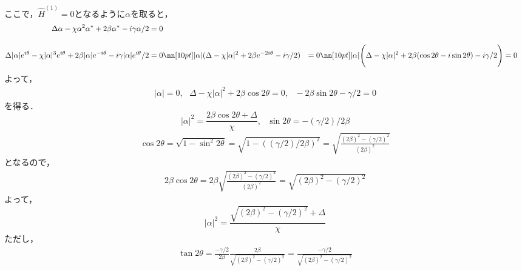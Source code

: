 ここで，$\hat{H}^{(1)}=0$となるように$\alpha$を取ると，
\begin{align}
    \Delta\alpha - \chi\alpha^2\alpha^{\ast} + 2\beta\alpha^{\ast} -i\gamma\alpha/2 &= 0\\[10pt]
    \Delta|\alpha|e^{i\theta} - \chi|\alpha|^3e^{i\theta} + 2\beta|\alpha|e^{-i\theta}
    -i\gamma|\alpha|e^{i\theta}/2&= 0
    \nn[10pt]
    |\alpha|(\Delta  - \chi|\alpha|^2 + 2\beta e^{-2i\theta}-i\gamma/2)&= 0
    \nn[10pt]
    |\alpha|\Biggl(\Delta  - \chi|\alpha|^2 + 2\beta(\cos{2\theta}-i\sin{2\theta})-i\gamma/2\Biggr) &= 0
\end{align}
よって，
\begin{align}
    |\alpha|=0,\ \ \  \Delta- \chi|\alpha|^2
    +2\beta\cos{2\theta}=0,\ \ \ -2\beta\sin{2\theta}-\gamma/2= 0
\end{align}
を得る．
\begin{equation}
    |\alpha|^2=\frac{2\beta\cos{2\theta}+\Delta}{\chi},\ \ \ 
    \sin{2\theta}=-(\gamma/2)/2\beta
\end{equation}
\begin{align}
    \cos{2\theta}=\sqrt{1-\sin^2{2\theta}}
    =\sqrt{1-((\gamma/2)/2\beta)^2}
    =\sqrt{\frac{(2\beta)^2-(\gamma/2)^2}{(2\beta)^2}}
\end{align}
となるので，
\begin{align}
    2\beta\cos{2\theta}=2\beta\sqrt{\frac{(2\beta)^2-(\gamma/2)^2}{(2\beta)^2}}
    =\sqrt{{(2\beta)^2-(\gamma/2)^2}}
\end{align}
よって，
\begin{equation}
    |\alpha|^2=\frac{\sqrt{{(2\beta)^2-(\gamma/2)^2}}+\Delta}{\chi}
\end{equation}
ただし，
\begin{align}
    \tan{2\theta}
    =\frac{-\gamma/2}{2\beta}\frac{2\beta}{\sqrt{{(2\beta)^2-(\gamma/2)^2}}}
    =\frac{-\gamma/2}{\sqrt{{(2\beta)^2-(\gamma/2)^2}}}
\end{align}
